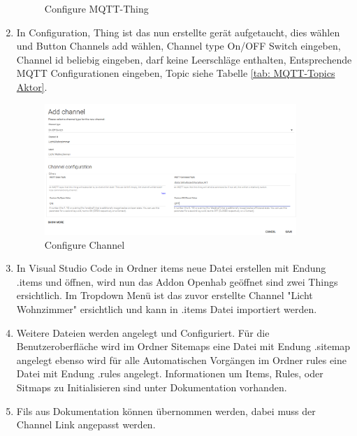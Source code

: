 \begin{enumerate}
\begin{figure}[H]
	\caption{Configure MQTT-Thing} 	
	\label{pic: Configure MQTT-Thing}
\end{figure} 
\item In Configuration, Thing ist das nun erstellte gerät aufgetaucht, dies wählen und Button Channels add wählen, Channel type On/OFF Switch eingeben, Channel id beliebig eingeben, darf keine Leerschläge enthalten, Entsprechende MQTT Configurationen eingeben, Topic siehe Tabelle \ref{tab: MQTT-Topics Aktor}.
   \begin{figure}[H]
	\centering
	\includegraphics[width=0.9\textwidth]{graphics/Channel.PNG}
	\caption{Configure Channel} 	
	\label{pic: Configure Channel}
\end{figure} 
\item In Visual Studio Code in Ordner items neue Datei erstellen mit Endung .items und öffnen, wird nun das Addon Openhab geöffnet sind zwei Things ersichtlich. Im Tropdown Menü ist das zuvor erstellte Channel "Licht Wohnzimmer" ersichtlich und kann in .items Datei importiert werden.
\item Weitere Dateien werden angelegt und Configuriert. Für die Benutzeroberfläche wird im Ordner Sitemaps eine Datei mit Endung .sitemap angelegt ebenso wird für alle Automatischen Vorgängen im Ordner rules eine Datei mit Endung .rules angelegt. Informationen um Items, Rules, oder Sitmaps zu Initialisieren sind unter Dokumentation \cite{noauthor_introduction_nodate} vorhanden.
\item	Fils aus Dokumentation können übernommen werden, dabei muss der Channel Link angepasst werden.
\end{enumerate}	